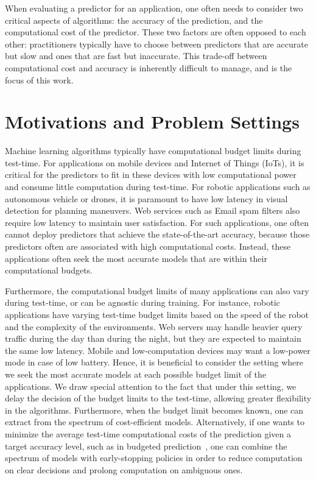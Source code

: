 

When evaluating a predictor for an application, one often needs to consider two critical aspects of algorithms: the accuracy of the prediction, and the computational cost of the predictor. These two factors are often opposed to each other: practitioners typically have to choose between predictors that are accurate but slow and ones that are fast but inaccurate. 
This trade-off between computational cost and accuracy is inherently difficult to manage, and is the focus of this work.


\section{Motivations and Problem Settings}

Machine learning algorithms typically have computational budget limits during test-time. For applications on mobile devices and Internet of Things (IoTs), it is critical for the predictors to fit in these devices with low computational power and consume little computation during test-time. For robotic applications such as autonomous vehicle or drones, it is paramount to have low latency in visual detection for planning maneuvers. Web services such as Email spam filters also require low latency to maintain user satisfaction. 
For such applications, one often cannot deploy predictors that achieve the state-of-the-art accuracy, because those predictors often are associated with high computational costs. Instead, these applications often seek the most accurate models that are within their computational budgets. 

Furthermore, the computational budget limits of many applications can also vary during test-time, or can be agnostic during training. 
For instance, robotic applications have varying test-time budget limits based on the speed of the robot and the complexity of the environments. 
Web servers may handle heavier query traffic during the day than during the night, but they are expected to maintain the same low latency. 
Mobile and low-computation devices may want a low-power mode in case of low battery. 
Hence, it is beneficial to consider the setting where we seek the most accurate models at each possible budget limit of the applications. 
We draw special attention to the fact that under this setting, we delay the decision of the budget limits to the test-time, allowing greater flexibility in the algorithms. Furthermore, when the budget limit becomes known, one can extract from the spectrum of cost-efficient models. Alternatively, if one wants to minimize the average test-time computational costs of the prediction given a target accuracy level, such as in budgeted prediction~\citep{cascade_nn,adaptivenn}, one can combine the spectrum of models with early-stopping policies in order to reduce computation on clear decisions and prolong computation on ambiguous ones.

